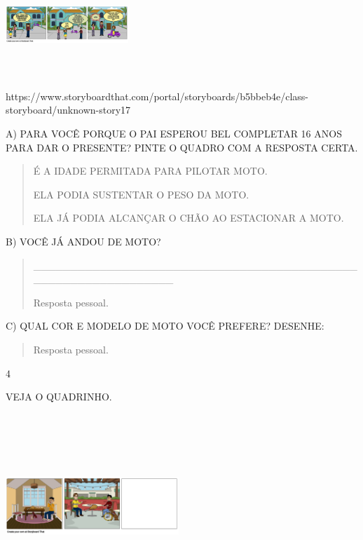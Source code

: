 {{{{{{\includegraphics[width=1.82014in,height=1.55486in]{media/image130.png}

https://www.storyboardthat.com/portal/storyboards/b5bbeb4e/class-storyboard/unknown-story17

A) PARA VOCÊ PORQUE O PAI ESPEROU BEL COMPLETAR 16 ANOS PARA DAR O
PRESENTE? PINTE O QUADRO COM A RESPOSTA CERTA.

\begin{quote}
É A IDADE PERMITADA PARA PILOTAR MOTO.

ELA PODIA SUSTENTAR O PESO DA MOTO.

ELA JÁ PODIA ALCANÇAR O CHÃO AO ESTACIONAR A MOTO.
\end{quote}

B) VOCÊ JÁ ANDOU DE MOTO?

\begin{quote}
\_\_\_\_\_\_\_\_\_\_\_\_\_\_\_\_\_\_\_\_\_\_\_\_\_\_\_\_\_\_\_\_\_\_\_\_\_\_\_\_\_\_\_\_\_\_\_\_\_\_\_\_\_\_\_\_\_\_\_\_\_\_\_

Resposta pessoal.
\end{quote}

C) QUAL COR E MODELO DE MOTO VOCÊ PREFERE? DESENHE:

\begin{quote}
Resposta pessoal.
\end{quote}

\num{4}

VEJA O QUADRINHO.

\includegraphics[width=2.57222in,height=2.73403in]{media/image131.png}

}}}}}}
